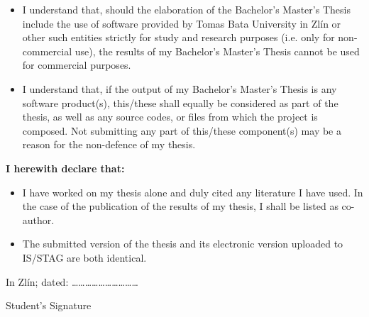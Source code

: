 {{\begin{itemize}
		\item{I understand that, should the elaboration of the \ifbp Bachelor's \else\ifdp Master's \fi\fi Thesis include the use of software provided by Tomas Bata University in Zlín or other such entities strictly for study and research purposes (i.e. only for non-commercial use), the results of my \ifbp Bachelor's \else\ifdp Master's \fi\fi Thesis cannot be used for commercial purposes.}
		\item{I understand that, if the output of my \ifbp Bachelor's \else\ifdp Master's \fi\fi Thesis is any software product(s), this/these shall equally be considered as part of the thesis, as well as any source codes, or files from which the project is composed. Not submitting any part of this/these component(s) may be a reason for the non-defence of my thesis.}
	\end{itemize}
	\medskip
	\textbf{I herewith declare that:}
	\begin{itemize}
		\setlength{\parskip}{0pt}
		\setlength{\itemsep}{0pt}
		\item{I have worked on my thesis alone and duly cited any literature I have used. In the case of the publication of the results of my thesis, I shall be listed as co-author.}
		\item{The submitted version of the thesis and its electronic version uploaded to IS/STAG are both identical.}
	\end{itemize}
	\medskip
	In Zlín; dated: \hspace{6.5cm}\dots\dots\dots\dots\dots\dots\dots\dots\dots\dots

	\hspace{10.3cm}Student's Signature
	
	\fi \fi
}}

